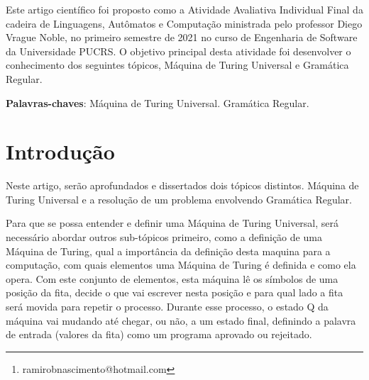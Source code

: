 \documentclass[
	article,			%
	11pt,				%
	oneside,			%
	a4paper,			%
	english,			%
	brazil,				%
	sumario=tradicional
	]{abntex2}
\author{Ramiro Berneira Nascimento\thanks{ramirobnascimento@hotmail.com}}
\begin{document}
\frenchspacing 


%
%
\maketitle
\begin{resumoumacoluna}
     Este artigo científico foi proposto como a Atividade Avaliativa Individual Final da cadeira de Linguagens, Autômatos e Computação ministrada pelo professor Diego Vrague Noble, no primeiro semestre de 2021 no curso de Engenharia de Software da Universidade PUCRS. O objetivo principal desta atividade foi desenvolver o conhecimento dos seguintes tópicos, Máquina de Turing Universal e Gramática Regular.
 
 \vspace{\onelineskip}
 
 \noindent
 \textbf{Palavras-chaves}: Máquina de Turing Universal. Gramática Regular.
\end{resumoumacoluna}


\textual

\section*{Introdução}

    Neste artigo, serão aprofundados e dissertados dois tópicos distintos. Máquina de Turing Universal e a resolução de um problema envolvendo Gramática Regular.  
    
    Para que se possa entender e definir uma Máquina de Turing Universal, será necessário abordar outros sub-tópicos primeiro, como a definição de uma Máquina de Turing, qual a importância da definição desta maquina para a computação, com quais elementos uma Máquina de Turing é definida e como ela opera. Com este conjunto de elementos, esta máquina lê os símbolos de uma posição da fita, decide o que vai escrever nesta posição e para qual lado a fita será movida para repetir o processo. Durante esse processo, o estado Q da máquina vai mudando até chegar, ou não, a um estado final, definindo a palavra de entrada (valores da fita) como um programa aprovado ou rejeitado.
    
\end{document}
